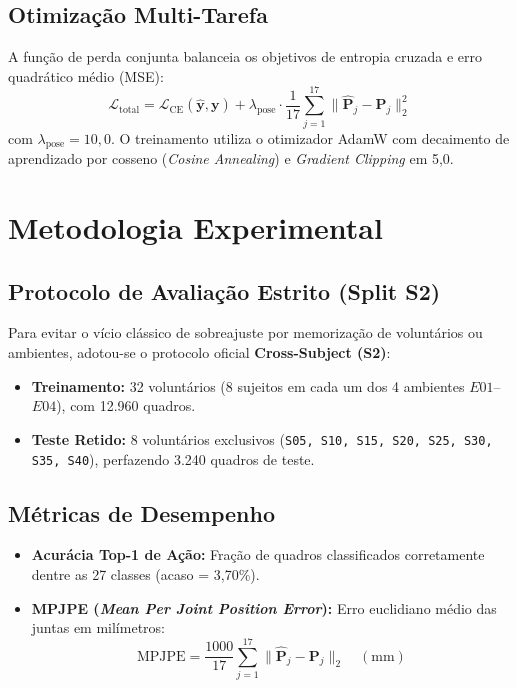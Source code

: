\documentclass[10pt,a4paper,twocolumn]{article}
\begin{document}
\subsection{Otimização Multi-Tarefa}
A função de perda conjunta balanceia os objetivos de entropia cruzada e erro quadrático médio (MSE):
\begin{equation}
\mathcal{L}_{\text{total}} = \mathcal{L}_{\text{CE}}(\hat{\mathbf{y}}, \mathbf{y}) + \lambda_{\text{pose}} \cdot \frac{1}{17} \sum_{j=1}^{17} \|\hat{\mathbf{P}}_j - \mathbf{P}_j\|_2^2
\end{equation}
com $\lambda_{\text{pose}} = 10{,}0$. O treinamento utiliza o otimizador AdamW com decaimento de aprendizado por cosseno (\textit{Cosine Annealing}) e \textit{Gradient Clipping} em 5{,}0.

\section{Metodologia Experimental}

\subsection{Protocolo de Avaliação Estrito (Split S2)}
Para evitar o vício clássico de sobreajuste por memorização de voluntários ou ambientes, adotou-se o protocolo oficial \textbf{Cross-Subject (S2)}:
\begin{itemize}
    \item \textbf{Treinamento:} 32 voluntários (8 sujeitos em cada um dos 4 ambientes $E01$--$E04$), com 12.960 quadros.
    \item \textbf{Teste Retido:} 8 voluntários exclusivos (\texttt{S05, S10, S15, S20, S25, S30, S35, S40}), perfazendo 3.240 quadros de teste.
\end{itemize}

\subsection{Métricas de Desempenho}
\begin{itemize}
    \item \textbf{Acurácia Top-1 de Ação:} Fração de quadros classificados corretamente dentre as 27 classes (acaso = 3,70\%).
    \item \textbf{MPJPE (\textit{Mean Per Joint Position Error}):} Erro euclidiano médio das juntas em milímetros:
    \begin{equation}
    \text{MPJPE} = \frac{1000}{17} \sum_{j=1}^{17} \|\hat{\mathbf{P}}_j - \mathbf{P}_j\|_2 \quad (\text{mm})
    \end{equation}
\end{itemize}
\end{document}
